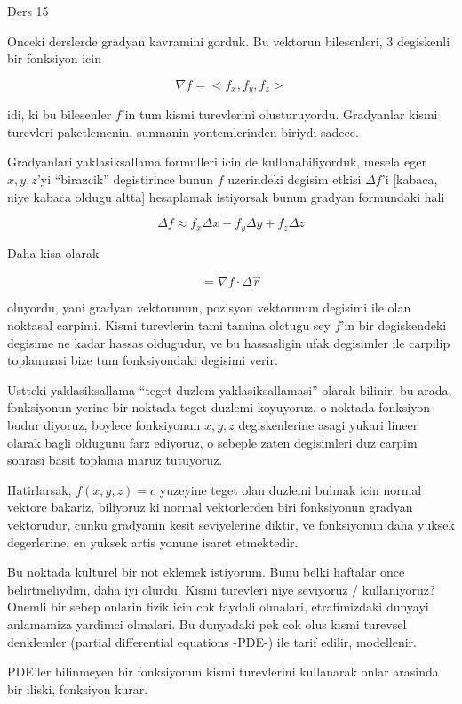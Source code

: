 \documentclass[12pt,fleqn]{article}\usepackage{../common}
\begin{document}
Ders 15

Onceki derslerde gradyan kavramini gorduk. Bu vektorun bilesenleri, 3
degiskenli bir fonksiyon icin

\[ \nabla f = <f_x, f_y, f_z> \]

idi, ki bu bilesenler $f$'in tum kismi turevlerini
olusturuyordu. Gradyanlar kismi turevleri paketlemenin, sunmanin
yontemlerinden biriydi sadece. 

Gradyanlari yaklasiksallama formulleri icin de kullanabiliyorduk, mesela
eger $x,y,z$'yi ``birazcik'' degistirince bunun $f$ uzerindeki degisim
etkisi $\Delta f$'i [kabaca, niye kabaca oldugu altta] hesaplamak
istiyorsak bunun gradyan formundaki hali

\[ \Delta f \approx f_x \Delta x + f_y \Delta y + f_z \Delta z \]

Daha kisa olarak 

\[ = \nabla f \cdot \Delta \vec{r} \]

oluyordu, yani gradyan vektorunun, pozisyon vektorunun degisimi ile olan
noktasal carpimi. Kismi turevlerin tami tamina olctugu sey $f$'in bir
degiskendeki degisime ne kadar hassas oldugudur, ve bu hassasligin ufak
degisimler ile carpilip toplanmasi bize tum fonksiyondaki degisimi verir.

Ustteki yaklasiksallama ``teget duzlem yaklasiksallamasi'' olarak bilinir,
bu arada, fonksiyonun yerine bir noktada teget duzlemi koyuyoruz, o noktada
fonksiyon budur diyoruz, boylece fonksiyonun $x,y,z$ degiskenlerine asagi
yukari lineer olarak bagli oldugunu farz ediyoruz, o sebeple zaten
degisimleri duz carpim sonrasi basit toplama maruz tutuyoruz. 

Hatirlarsak, $f(x,y,z)=c$ yuzeyine teget olan duzlemi bulmak icin normal
vektore bakariz, biliyoruz ki normal vektorlerden biri fonksiyonun gradyan
vektorudur, cunku gradyanin kesit seviyelerine diktir, ve fonksiyonun daha
yuksek degerlerine, en yuksek artis yonune isaret etmektedir. 

Bu noktada kulturel bir not eklemek istiyorum. Bunu belki haftalar once
belirtmeliydim, daha iyi olurdu. Kismi turevleri niye seviyoruz /
kullaniyoruz? Onemli bir sebep onlarin fizik icin cok faydali olmalari,
etrafimizdaki dunyayi anlamamiza yardimci olmalari. Bu dunyadaki pek cok
olus kismi turevsel denklemler (partial differential equations -PDE-) ile
tarif edilir, modellenir.

PDE'ler bilinmeyen bir fonksiyonun kismi turevlerini kullanarak onlar
arasinda bir iliski, fonksiyon kurar. 
\end{document}
